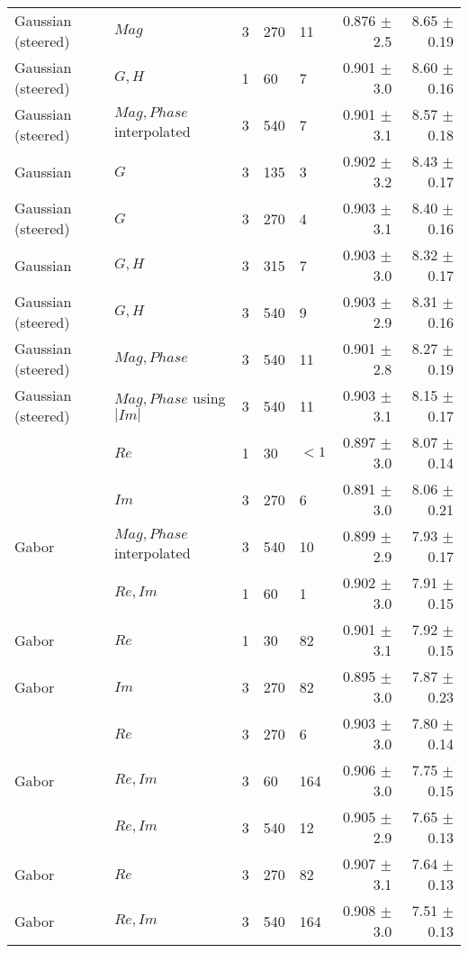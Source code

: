 \begin{tabularx}{\linewidth}{p{3cm} X X X X r r}
Gaussian (steered)& $Mag$           & 3 &   270 &  11   & 0.876 $\pm$ 2.5   & 8.65 $\pm$ 0.19 \\
Gaussian (steered)& $G,H$           & 1 &    60 &   7   & 0.901 $\pm$ 3.0   & 8.60 $\pm$ 0.16 \\
Gaussian (steered)& $Mag, Phase$ interpolated
                                    & 3 &   540 &   7   & 0.901 $\pm$ 3.1   & 8.57 $\pm$ 0.18 \\
Gaussian    & $G$                   & 3 &   135 &   3   & 0.902 $\pm$ 3.2   & 8.43 $\pm$ 0.17 \\
Gaussian (steered)& $G$             & 3 &   270 &   4   & 0.903 $\pm$ 3.1   & 8.40 $\pm$ 0.16 \\

Gaussian    & $G, H$                & 3 &   315 &   7   & 0.903 $\pm$ 3.0   & 8.32 $\pm$ 0.17 \\
Gaussian (steered)& $G,H$           & 3 &   540 &   9   & 0.903 $\pm$ 2.9   & 8.31 $\pm$ 0.16 \\
Gaussian (steered)& $Mag, Phase$    & 3 &   540 &  11   & 0.901 $\pm$ 2.8   & 8.27 $\pm$ 0.19 \\
Gaussian (steered)& $Mag, Phase$ using $|Im|$
                                    & 3 &   540 &  11   & 0.903 $\pm$ 3.1   & 8.15 $\pm$ 0.17 \\

\dtcwt{}& $Re$                      & 1 &    30 &${<}1$ & 0.897 $\pm$ 3.0   & 8.07 $\pm$ 0.14  \\
\dtcwt{}& $Im$                      & 3 &   270 &   6   & 0.891 $\pm$ 3.0   & 8.06 $\pm$ 0.21 \\

Gabor   & $Mag, Phase$ interpolated & 3 &   540 &  10   & 0.899 $\pm$ 2.9   & 7.93 $\pm$ 0.17 \\

\dtcwt{}& $Re,Im$                   & 1 &    60 &   1   & 0.902 $\pm$ 3.0   & 7.91 $\pm$ 0.15 \\
Gabor   & $Re$                      & 1 &    30 &  82   & 0.901 $\pm$ 3.1   & 7.92 $\pm$ 0.15 \\
Gabor   & $Im$                      & 3 &   270 &  82   & 0.895 $\pm$ 3.0   & 7.87 $\pm$ 0.23 \\
\dtcwt{}& $Re$                      & 3 &   270 &   6   & 0.903 $\pm$ 3.0   & 7.80 $\pm$ 0.14 \\
Gabor   & $Re,Im$                   & 3 &    60 & 164   & 0.906 $\pm$ 3.0   & 7.75 $\pm$ 0.15 \\
\dtcwt{}& $Re,Im$                   & 3 &   540 &  12   & 0.905 $\pm$ 2.9   & 7.65 $\pm$ 0.13 \\
Gabor   & $Re$                      & 3 &   270 &  82   & 0.907 $\pm$ 3.1   & 7.64 $\pm$ 0.13 \\
Gabor   & $Re,Im$                   & 3 &   540 & 164   & 0.908 $\pm$ 3.0   & 7.51 $\pm$ 0.13 \\



\end{tabularx}
